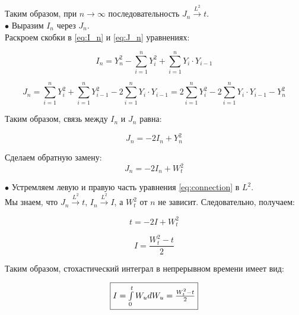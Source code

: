 \documentclass[a4paper]{article}
\begin{document}
 Таким образом, при $n \rightarrow \infty$ последовательность $J_n \xrightarrow{L^2} t.$\\

 $\bullet$ Выразим $I_n$ через $J_n$.\\

 Раскроем скобки в \eqref{eq:I_n} и \eqref{eq:J_n} уравнениях:

 $$I_n=Y^{2}_{n}-\sum_{i=1}^{n}Y^{2}_{i}+\sum_{i=1}^{n}Y_i\cdot Y_{i-1}$$

 $$J_n=\sum_{i=1}^{n}Y^{2}_{i}+\sum_{i=1}^{n}Y^{2}_{i-1}-2\sum_{i=1}^{n}Y_i\cdot Y_{i-1}=2\sum_{i=1}^{n}Y^{2}_{i}-2\sum_{i=1}^{n}Y_i\cdot Y_{i-1}-Y^{2}_{n}$$

 Таким образом, связь между $I_n$ и $J_n$ равна:

 $$J_n=-2I_n+Y^{2}_{n}$$

 Сделаем обратную замену:
 \begin{equation}\label{eq:connection}
 J_n=-2I_n+W^{2}_{t}
 \end{equation}

 $\bullet$ Устремляем левую и правую часть уравнения \eqref{eq:connection} в $L^2$. \\

 Мы знаем, что $J_n \xrightarrow{L^2} t$, $I_n \xrightarrow{L^2} I$, а $W^{2}_{t}$ от $n$ не зависит. Следовательно, получаем:

 $$t=-2I+W^{2}_{t}$$

 $$I=\frac{W^{2}_{t}-t}{2}$$

 Таким образом, стохастический интеграл в непрерывном времени имеет вид:

 \begin{equation*}
  \fbox{$I=\int\limits_{0}^{t}W_udW_u=\frac{W^{2}_{t}-t}{2}$}
  \end{equation*}
\end{document}
